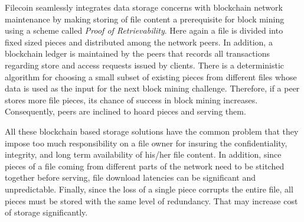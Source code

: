 Filecoin \cite{filecoin} seamlessly integrates data storage concerns with blockchain network maintenance by making storing of file content a prerequisite for block mining using a scheme called {\it Proof of Retrievability}. Here again a file is divided into fixed sized pieces and distributed among the network peers. In addition, a blockchain ledger is maintained by the peers that records all transactions regarding store and access requests issued by clients. There is a deterministic algorithm for choosing a small subset of existing pieces from different files whose data is used as the input for the next block mining challenge. Therefore, if a peer stores more file pieces, its chance of success in block mining increases. Consequently, peers are inclined to hoard pieces and serving them.   

All these blockchain based storage solutions have the common problem that they impose too much responsibility on a file owner for insuring the confidentiality, integrity, and long term availability of his/her file content. In addition, since pieces of a file coming from different parts of the network need to be stitched together before serving, file download latencies can be significant and unpredictable. Finally, since the loss of a single piece corrupts the entire file, all pieces must be stored with the same level of redundancy. That may increase cost of storage significantly.


